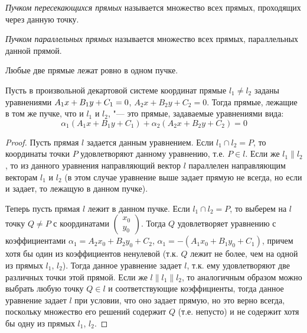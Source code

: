 \begin{definition}
	\textit{Пучком пересекающихся прямых} называется множество всех прямых, проходящих через данную точку.
\end{definition}

\begin{definition}
	\textit{Пучком параллельных прямых} называется множество всех прямых, параллельных данной прямой.
\end{definition}

\begin{note}
	Любые две прямые лежат ровно в одном пучке.
\end{note}

\begin{theorem}
	Пусть в произвольной декартовой системе координат прямые $l_1 \ne l_2$ заданы уравнениями $A_1x\hm{+}B_1y+C_1=0$, $A_2x+B_2y+C_2=0$. Тогда прямые, лежащие в том же пучке, что и $l_1$ и $l_2$, "--- это прямые, задаваемые уравнениями вида:
	\[\alpha_1(A_1x+B_1y+C_1) + \alpha_2(A_2x+B_2y+C_2) = 0\]
\end{theorem}

\begin{proof}
	Пусть прямая $l$ задается данным уравнением. Если $l_1 \cap l_2 = P$, то координаты точки $P$ удовлетворяют данному уравнению, т.\:е. $P \in l$. Если же $l_1 \parallel l_2$, то из данного уравнения направляющий вектор $l$ параллелен направляющим векторам $l_1$ и $l_2$ (в этом случае уравнение выше задает прямую не всегда, но если и задает, то лежащую в данном пучке).
	
	Теперь пусть прямая $l$ лежит в данном пучке. Если $l_1 \cap l_2 = P$, то выберем на $l$ точку $Q \ne P$ с координатами $\begin{pmatrix}x_0\\y_0\end{pmatrix}$. Тогда $Q$ удовлетворяет уравнению с коэффициентами $\alpha_1 = A_2x_0+B_2y_0+C_2$, $\alpha_1 = -(A_1x_0+B_1y_0+C_1)$, причем хотя бы один из коэффициентов ненулевой (т.\:к. $Q$ лежит не более, чем на одной из прямых $l_1$, $l_2$). Тогда данное уравнение задает $l$, т.\:к. ему удовлетворяют две различных точки этой прямой. Если же $l \parallel l_1 \parallel l_2$, то аналогичным образом можно выбрать любую точку $Q \in l$ и соответствующие коэффициенты, тогда данное уравнение задает $l$ при условии, что оно задает прямую, но это верно всегда, поскольку множество его решений содержит $Q$ (т.\:е. непусто) и не содержит хотя бы одну из прямых $l_1$, $l_2$.
\end{proof}

